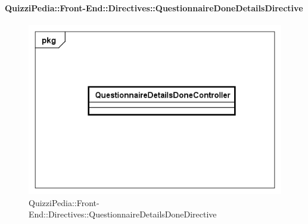 \paragraph{QuizziPedia::Front-End::Directives::QuestionnaireDoneDetailsDirective}

\label{QuizziPedia::Front-End::Directives::QuestionnaireDoneDetailsDirective}

\begin{figure}[h]
	\centering
	\includegraphics[scale=0.5,keepaspectratio]{UML/Classi/Front-End/QuizziPedia_Front-end_Directives_QuestionnaireDetailsDoneDirective.png}
	\caption{QuizziPedia::Front-End::Directives::QuestionnaireDetailsDoneDirective}
\end{figure}

